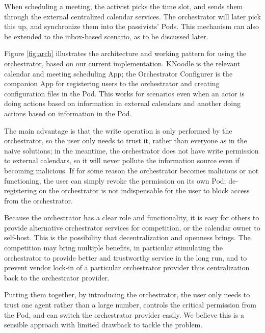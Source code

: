 \documentclass[
twocolumn,
]{ceurart}
\begin{document}
When scheduling a meeting, the activist picks the time slot, and sends them through the external centralized calendar services. The orchestrator will later pick this up, and synchronize them into the passivists' Pods. This mechanism can also be extended to the inbox-based scenario, as to be discussed later.

Figure \ref{fig:arch} illustrates the architecture and working pattern for using the orchestrator, based on our current implementation. KNoodle is the relevant calendar and meeting scheduling App; the Orchestrator Configurer is the companion App for registering users to the orchestrator and creating configuration files in the Pod. This works for scenarios even when an actor is doing actions based on information in external calendars and another doing actions based on information in the Pod.

The main advantage is that the write operation is only performed by the orchestrator, so the user only needs to trust it, rather than everyone as in the naive solutions; in the meantime, the orchestrator does not have write permission to external calendars, so it will never pollute the information source even if becoming malicious. If for some reason the orchestrator becomes malicious or not functioning, the user can simply revoke the permission on its own Pod; de-registering on the orchestrator is not indispensable for the user to block access from the orchestrator.

Because the orchestrator has a clear role and functionality, it is easy for others to provide alternative orchestrator services for competition, or the calendar owner to self-host. This is the possibility that decentralization and openness brings. The competition may bring multiple benefits, in particular stimulating the orchestrator to provide better and trustworthy service in the long run, and to prevent vendor lock-in of a particular orchestrator provider thus centralization back to the orchestrator provider.

Putting them together, by introducing the orchestrator, the user only needs to trust one agent rather than a large number, controls the critical permission from the Pod, and can switch the orchestrator provider easily. We believe this is a sensible approach with limited drawback to tackle the problem.





\end{document}
